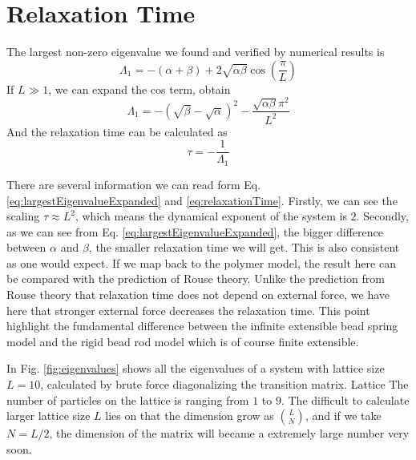 \section{Relaxation Time}
\label{sec:relaxation_time}

The largest non-zero eigenvalue we found and verified by numerical results is 
\begin{equation}
    \label{eq:largestEigenvalue}
    \Lambda_1 = -(\alpha+\beta) +
    2\sqrt{\alpha\beta}\cos(\frac{\pi}{L})
\end{equation}
If $L \gg 1$, we can expand the cos term, obtain 
\begin{equation}
    \label{eq:largestEigenvalueExpanded}
    \Lambda_1 = -(\sqrt{\beta}-\sqrt{\alpha})^2 -
    \frac{\sqrt{\alpha\beta}\pi^2}{L^2}
\end{equation}
And the relaxation time can be calculated as 
\begin{equation}
    \label{eq:relaxationTime}
    \tau = -\frac{1}{\Lambda_1}
\end{equation}

There are several information we can read form Eq.
\eqref{eq:largestEigenvalueExpanded} and \eqref{eq:relaxationTime}. Firstly, we
can see the scaling $\tau \approx L^2$, which means the dynamical exponent of
the system is $2$. Secondly, as we can see from Eq.
\eqref{eq:largestEigenvalueExpanded}, the bigger difference between $\alpha$
and $\beta$, the smaller relaxation time we will get. This is also consistent
as one would expect. If we map back to the polymer model, the result here can
be compared with the prediction of Rouse theory. Unlike the prediction
from Rouse theory that relaxation time does not depend on external force, we
have here that stronger external force decreases the relaxation time. This
point highlight the fundamental difference between the infinite extensible bead
spring model and the rigid bead rod model which is of course finite extensible. 

In Fig.  \ref{fig:eigenvalues} shows all the eigenvalues of a system with
lattice size $L=10$, calculated by brute force diagonalizing the transition
matrix.  Lattice The number of particles on the lattice is ranging from $1$ to
$9$. The difficult to calculate larger lattice size $L$ lies on that the
dimension grow as $\binom{L}{N}$, and if we take $N=L/2$, the dimension of the
matrix will became a extremely large number very soon. 


